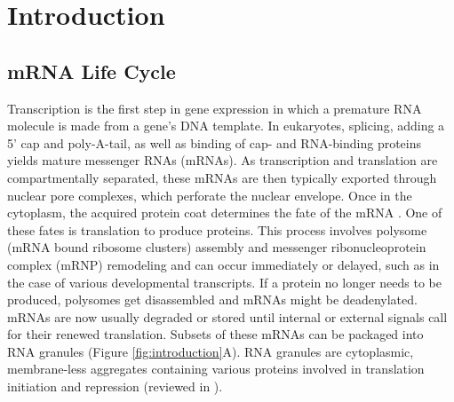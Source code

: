 \chapter{Introduction}


\section{mRNA Life Cycle}

Transcription is the first step in gene expression in which a premature RNA molecule is made from a gene's DNA template.
In eukaryotes, splicing, adding a 5' cap and poly-A-tail, as well as binding of cap- and RNA-binding proteins yields mature messenger RNAs (mRNAs).
As transcription and translation are compartmentally separated, these mRNAs are then typically exported through nuclear pore complexes, which perforate the nuclear envelope.
Once in the cytoplasm, the acquired protein coat determines the fate of the mRNA \cite{moore_birth_2005}.
One of these fates is translation to produce proteins.
This process involves polysome (mRNA bound ribosome clusters) assembly and messenger ribonucleoprotein complex (mRNP) remodeling and can occur immediately or delayed, such as in the case of various developmental transcripts.
If a protein no longer needs to be produced, polysomes get disassembled and mRNAs might be deadenylated.
mRNAs are now usually degraded or stored until internal or external signals call for their renewed translation.
Subsets of these mRNAs can be packaged into RNA granules (Figure \ref{fig:introduction}A).
RNA granules are cytoplasmic, membrane-less aggregates containing various proteins involved in translation initiation and repression (reviewed in \cite{anderson_rna_2006}).

